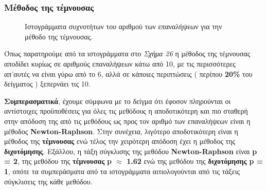\documentclass[First Project.tex]{subfiles}
\begin{document}
\subsubsection{\textbf{Μέθοδος της τέμνουσας}}
\begin{figure}[h!]
    \centering
    \quad
    \caption{ Ιστογράμματα συχνοτήτων του αριθμού των επαναλήψεων για την μέθοδο της τέμνουσας. }
\end{figure}
Όπως παρατηρούμε από τα ιστογράμματα στο \textit{Σχήμα 26} η μέθοδος της τέμνουσας αποδίδει κυρίως σε αριθμούς επαναλήψεων κάτω από 10, με τις
περισσότερες απ'αυτές να είναι γύρω από το 6, αλλά σε κάποιες περιπτώσεις ( περίπου \textbf{20\%} του δείγματος ) ξεπερνάει τις 10.

\textbf{Συμπερασματικά}, έχουμε σύμφωνα με το δείγμα ότι έφοσον πληρούνται οι αντίστοιχες προϋποθέσεις για όλες τις μεθόδους η αποδοτικότερη και πιο σταθερή
στην απόδοση της από τις μεθόδους ως προς τον αριθμό των επαναλήψεων είναι η μέθοδος \textlatin{\textbf{Newton-Raphson}}. Στην συνέχεια, λιγότερο αποδοτικότερη είναι η μέθοδος της \textbf{τέμνουσας}
ενώ τέλος την χειρότερη απόδοση έχει η μέθοδος της \textbf{διχοτόμησης}. Εξάλλου, η τάξη σύγκλισης της μεθόδου \textlatin{\textbf{Newton-Raphson}} είναι
\textbf{\textlatin{p} = 2}, της μεθόδου της \textbf{τέμνουσας} \textbf{\textlatin{p} $\approx$ 1.62} ενώ της μεθόδου της \textbf{διχοτόμησης} \textbf{\textlatin{p} = 1}, οπότε τα συμπεράσματα από τα 
ιστογράμματα αιτιολογούνται από τις τάξεις σύγκλισεις της κάθε μεθόδου.
 
\end{document}
